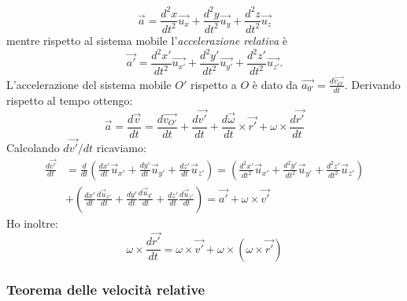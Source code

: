 \documentclass[class=book, crop=false, oneside, 12pt]{standalone}
\begin{document}
\begin{equation}
    \overrightarrow{a} = \frac{d^2 x }{dt^2} \overrightarrow{u_x} + \frac{d^2 y }{dt^2} \overrightarrow{u_y} + \frac{d^2 z }{dt^2} \overrightarrow{u_z}
\end{equation}
mentre rispetto al sistema mobile l'\emph{accelerazione relativa} è
\begin{equation}
    \overrightarrow{a'} = \frac{d^2 x' }{dt^2} \overrightarrow{u_{x'}} + \frac{d^2 y' }{dt^2} \overrightarrow{u_{y'}} + \frac{d^2 z' }{dt^2} \overrightarrow{u_{z'}} . 
\end{equation}
L'accelerazione del sistema mobile \(O'\) rispetto a \(O\) è dato da \(\overrightarrow{a_{0'}} = \frac{d \overrightarrow{v_{O'}}}{dt}\). Derivando rispetto al tempo ottengo:
\begin{equation}
    \overrightarrow{a} = \frac{d \overrightarrow{v}}{dt} = \frac{d \overrightarrow{v_{O'}}}{dt} + \frac{d \overrightarrow{v'}}{dt} + \frac{d \overrightarrow{\omega}}{dt} \times \overrightarrow{r'} + \omega \times \frac{d \overrightarrow{r'}}{dt}
\end{equation}
Calcolando \(d \overrightarrow{v'} / dt\) ricaviamo:
\begin{equation}
\begin{aligned}
    \frac{d \overrightarrow{v'}}{d t} &=\frac{d}{d t} \left(\frac{d x'}{d t} \overrightarrow{u}_{x'}+\frac{d y'}{d t} \overrightarrow{u}_{y'}+\frac{d z'}{d t} \overrightarrow{u}_{z'}\right) = \left( \frac{d^{2} x'}{d t^{2}} \overrightarrow{u}_{x'}+\frac{d^{2} y'}{d t^{2}} \overrightarrow{u}_{y'} + \frac{d^{2} z'}{d t^{2}} \overrightarrow{u}_{z'} \right)\\
    & + \left( \frac{d x'}{d t} \frac{d \overrightarrow{u}_{x'}}{d t}+\frac{d y'}{d t} \frac{d \overrightarrow{u}_{y'}}{d t}+\frac{d z'}{d t} \frac{d \overrightarrow{u}_{z'}}{d t} \right)=\overrightarrow{a'}+\omega \times \overrightarrow{v'} 
\end{aligned}
\end{equation}
Ho inoltre:
\begin{equation*}
    \omega \times \frac{d \overrightarrow{r'}}{dt} = \omega \times \overrightarrow{v'} + \omega \times ( \omega \times \overrightarrow{r'})
\end{equation*}

\subsubsection{Teorema delle velocità relative}
\end{document}
